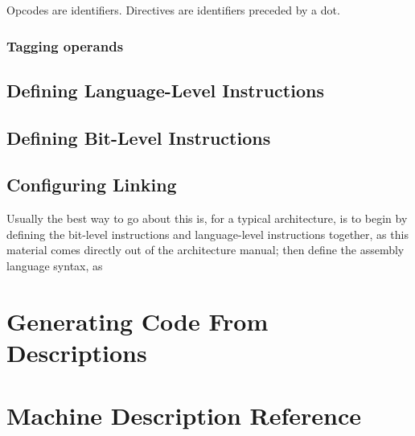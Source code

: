 Opcodes are identifiers.
Directives are identifiers preceded by a dot.

\subsubsection{Tagging operands}



\subsection{Defining Language-Level Instructions}
\subsection{Defining Bit-Level Instructions}
\subsection{Configuring Linking}


Usually the best way to go about this is, for a typical architecture,
is to begin by defining the bit-level instructions and language-level
instructions together, as this material comes directly out of the
architecture manual; then define the assembly language syntax, as


\section{Generating Code From Descriptions}

\section{Machine Description Reference}




